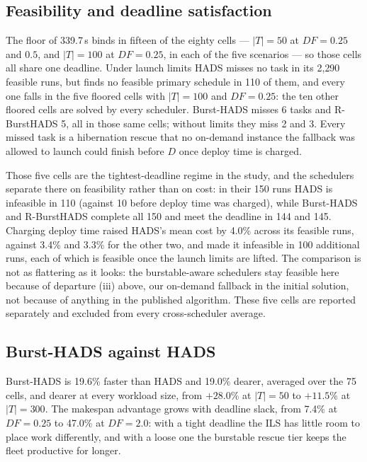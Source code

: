 \documentclass[conference]{IEEEtran}
\begin{document}
\subsection{Feasibility and deadline satisfaction}

The floor of 339.7\,s binds in fifteen of the eighty cells --- $|T| = 50$ at
$\mathit{DF} = 0.25$ and $0.5$, and $|T| = 100$ at $\mathit{DF} = 0.25$, in
each of the five scenarios --- so those cells all share one deadline. Under
launch limits HADS misses no task in its 2{,}290 feasible runs, but finds no
feasible primary schedule in 110 of them, and every one falls in the five
floored cells with $|T| = 100$ and $\mathit{DF} = 0.25$: the ten other floored
cells are solved by every scheduler. Burst-HADS misses 6 tasks and R-BurstHADS 5, all in those same cells;
without limits they miss 2 and 3. Every missed task is a hibernation rescue
that no on-demand instance the fallback was allowed to launch could finish
before $D$ once deploy time is charged.

Those five cells are the tightest-deadline regime in the study, and the
schedulers separate there on feasibility rather than on cost: in their 150
runs HADS is infeasible in 110 (against 10 before deploy time was charged),
while Burst-HADS and R-BurstHADS complete all 150 and meet the deadline in 144
and 145. Charging deploy time raised HADS's mean cost by 4.0\% across its
feasible runs, against 3.4\% and 3.3\% for the other two, and made it
infeasible in 100 additional runs, each of which is feasible once the launch
limits are lifted. The comparison is not as flattering as it looks: the
burstable-aware schedulers stay feasible here because of departure (iii) above,
our on-demand fallback in the initial solution, not because of anything in the
published algorithm. These five cells are reported separately and excluded from
every cross-scheduler average.

\subsection{Burst-HADS against HADS}

Burst-HADS is 19.6\% faster than HADS and 19.0\% dearer, averaged over the 75
cells, and dearer at every workload size, from $+28.0$\% at $|T| = 50$ to
$+11.5$\% at $|T| = 300$. The makespan advantage grows with deadline slack, from
7.4\% at $\mathit{DF} = 0.25$ to 47.0\% at $\mathit{DF} = 2.0$: with a tight
deadline the ILS has little room to place work differently, and with a loose one
the burstable rescue tier keeps the fleet productive for longer.
\end{document}
